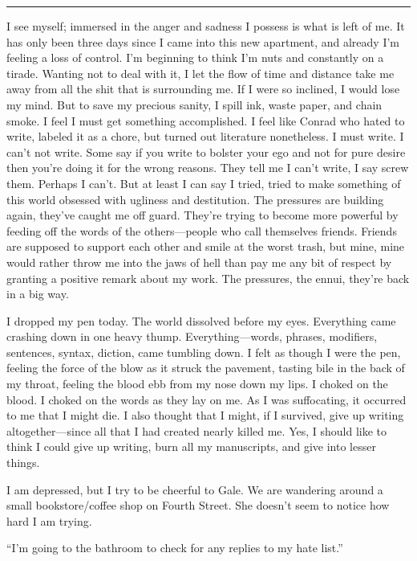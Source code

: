 \begin{center}\rule{0.5\linewidth}{0.5pt}\end{center}

I see myself; immersed in the anger and sadness I possess is what is
left of me. It has only been three days since I came into this new
apartment, and already I'm feeling a loss of control. I'm beginning to
think I'm nuts and constantly on a tirade. Wanting not to deal with it,
I let the flow of time and distance take me away from all the shit that
is surrounding me. If I were so inclined, I would lose my mind. But to
save my precious sanity, I spill ink, waste paper, and chain smoke. I
feel I must get something accomplished. I feel like Conrad who hated to
write, labeled it as a chore, but turned out literature nonetheless. I
must write. I can't not write. Some say if you write to bolster your ego
and not for pure desire then you're doing it for the wrong reasons. They
tell me I can't write, I say screw them. Perhaps I can't. But at least I
can say I tried, tried to make something of this world obsessed with
ugliness and destitution. The pressures are building again, they've
caught me off guard. They're trying to become more powerful by feeding
off the words of the others---people who call themselves friends.
Friends are supposed to support each other and smile at the worst trash,
but mine, mine would rather throw me into the jaws of hell than pay me
any bit of respect by granting a positive remark about my work. The
pressures, the ennui, they're back in a big way.

I dropped my pen today. The world dissolved before my eyes. Everything
came crashing down in one heavy thump. Everything---words, phrases,
modifiers, sentences, syntax, diction, came tumbling down. I felt as
though I were the pen, feeling the force of the blow as it struck the
pavement, tasting bile in the back of my throat, feeling the blood ebb
from my nose down my lips. I choked on the blood. I choked on the words
as they lay on me. As I was suffocating, it occurred to me that I might
die. I also thought that I might, if I survived, give up writing
altogether---since all that I had created nearly killed me. Yes, I
should like to think I could give up writing, burn all my manuscripts,
and give into lesser things.

I am depressed, but I try to be cheerful to Gale. We are wandering
around a small bookstore/coffee shop on Fourth Street. She doesn't seem
to notice how hard I am trying.

``I'm going to the bathroom to check for any replies to my hate list.''

